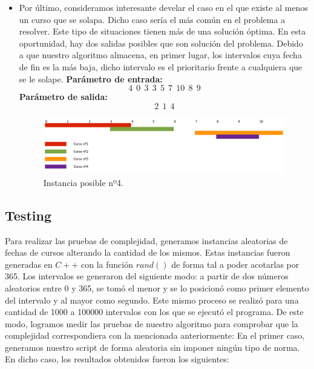 \begin{itemize}
\item Por último, consideramos interesante develar el caso en el que existe al menos un curso que se solapa. Dicho caso sería el más común en el problema a resolver. Este tipo de situaciones tienen más de una solución óptima. En esta oportunidad, hay dos salidas posibles que son solución del problema. Debido a que nuestro algoritmo almacena, en primer lugar, los intervalos cuya fecha de fin es la más baja, dicho intervalo es el prioritario frente a cualquiera que se le solape.\newline
\textbf{Parámetro de entrada:}  $$4\ \ 0\ \ 3\ \ 3\ \ 5\ \ 7\ \ 10\ \ 8\ \ 9$$
\textbf{Parámetro de salida:}  $$2\ \ 1\ \ 4$$ \newline

\begin{figure}[H] %
\begin{center}
\includegraphics[width=470pt]{../imgs/instancia1.jpg}
\end{center}
\caption{Instancia posible nº4.}
\end{figure}

\end{itemize}

\subsection{Testing}
Para realizar las pruebas de complejidad, generamos instancias aleatorias de fechas de cursos alterando la cantidad de los mismos. Estas instancias fueron generadas en $C++$ con la función $rand()$ de forma tal a poder acotarlas por 365. Los intervalos se generaron del siguiente modo: a partir de dos números aleatorios entre 0 y 365, se tomó el menor y se lo posicionó como primer elemento del intervalo y al mayor como segundo. Este mismo proceso se realizó para una cantidad de 1000 a 100000 intervalos con los que se ejecutó el programa. De este modo, logramos medir las pruebas de nuestro algoritmo para comprobar que la complejidad correspondiera con la mencionada anteriormente:\newline
\newline
En el primer caso, generamos nuestro script de forma aleatoria sin imponer ningún tipo de norma. En dicho caso, los resultados obtenidos fueron los siguientes:

